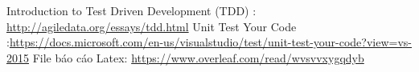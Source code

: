 \documentclass[a4paper]{article}
\begin{document}
\begin{thebibliography}{9}
Introduction to Test Driven Development (TDD) : \url{http://agiledata.org/essays/tdd.html}
Unit Test Your Code :\url{https://docs.microsoft.com/en-us/visualstudio/test/unit-test-your-code?view=vs-2015}
\bibitem{}File báo cáo Latex: \url{https://www.overleaf.com/read/wvsvvxygqdyb}
\end{thebibliography}
\end{document}
